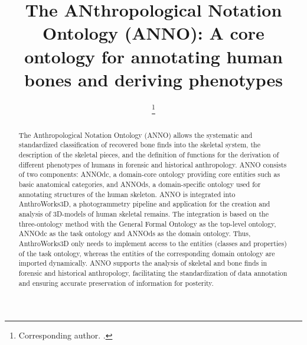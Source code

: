 \documentclass[sw]{iosart2x}
\begin{document}
\begin{frontmatter}

\title{The ANthropological Notation Ontology (ANNO): A core ontology for annotating human bones and deriving phenotypes}

\begin{aug}
\author[B,C]{ }
\author[A,C]{ %
\thanks{Corresponding author. .}
}
\author[B]{ }
\author[B]{ }
\author[A]{ }
\address[A]{Institute for Medical Informatics, Statistics and Epidemiology (IMISE), ,
Saxony, }
\address[B]{,
Saxony, }
\address[C]{equal contribution}
\end{aug}

\begin{abstract}
The Anthropological Notation Ontology (ANNO) allows the systematic and standardized classification of recovered bone finds into the skeletal system, the description of the skeletal pieces, and the definition of functions for the derivation of different phenotypes of humans in forensic and historical anthropology.
ANNO consists of two components:
ANNOdc, a domain-core ontology providing core entities such as basic anatomical categories, and ANNOds, a domain-specific ontology used for annotating structures of the human skeleton.
ANNO is integrated into AnthroWorks3D, a photogrammetry pipeline and application for the creation and analysis of 3D-models of human skeletal remains.
The integration is based on the three-ontology method with the General Formal Ontology as the top-level ontology, ANNOdc as the task ontology and ANNOds as the domain ontology.
Thus, AnthroWorks3D only needs to implement access to the entities (classes and properties) of the task ontology, whereas the entities of the corresponding domain ontology are imported dynamically.
ANNO supports the analysis of skeletal and bone finds in forensic and historical anthropology, facilitating the standardization of data annotation and ensuring accurate preservation of information for posterity.
\end{abstract}

\begin{keyword}
\end{keyword}

\end{frontmatter}
\end{document}
